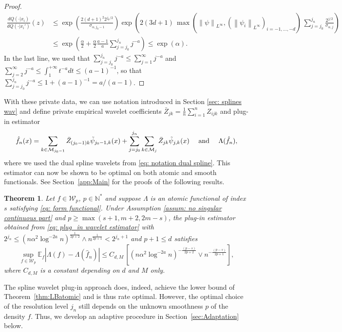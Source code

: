 \documentclass[preprint]{imsart}
\newcommand\norm[1]{\left\lVert#1\right\rVert}
\newtheorem{theorem}{Theorem}[section]
\numberwithin{equation}{section}
\begin{document}
\begin{proof}
\begin{align*}
\frac{dQ(\cdot |x_i)}{dQ(\cdot |x_i')}(z)
&\leq \exp\left(  \frac{2(d+1)^2 2^{j_0/2}}{\sigma_{\alpha,j_0-1}}\right)\exp\left( 2(3d+1)\, \max(\norm{\psi}_{L^\infty},(\norm{\psi_i}_{L^\infty})_{i=-1,\dots,-d})\, \sum_{j=j_0}^{j_n}\frac{2^{j/2}}{\sigma_{\alpha,j}}\right)\\
&\leq \exp\left(\frac{\alpha}{2} + \frac{\alpha}{2}\frac{a-1}{a} \sum_{j=j_0}^{j_n} j^{-a}\right)\leq \exp(\alpha).
\end{align*}
In the last line, we used that $\sum_{j=j_0}^{j_n} j^{-a} \leq \sum_{j=1}^{\infty} j^{-a}$ and $ \sum_{j=2}^{\infty} j^{-a}\leq \int_1^{+\infty} t^{-a} dt\leq (a-1)^{-1}$, so that $\sum_{j=j_0}^{j_n} j^{-a}\leq 1 + (a-1)^{-1} = a/(a-1)$.
\end{proof}

With these private data, we can use notation introduced in Section \ref{sec: splines wav} and define private empirical wavelet coefficients $\bar{Z}_{jk}=\frac1n \sum_{i=1}^n Z_{ijk}$ and plug-in estimator
\begin{equation}\label{eq: plug_in wavelet estimator}
\hat{f}_n(x)= \sum_{k\in\mathcal{M}_{j_0-1}} \bar{Z}_{(j_0-1)k}\Tilde{\psi}_{j_0-1,k}(x) + \sum_{j=j_0}^{j_n}\sum_{k\in\mathcal{M}_{j}} \bar{Z}_{jk} \Tilde{\psi}_{j,k}(x) \quad\text{ and }\quad \Lambda(\hat{f}_n),
\end{equation}
where we used the dual spline wavelets from \eqref{eq: notation dual spline}. This estimator can now be shown to be optimal on both atomic and smooth functionals. See Section~\ref{app:Main} for the proofs of the following results.
 

\begin{theorem}\label{th: atomic wav}
    Let $f\in \mathcal{W}_{p}$, $p\in\mathbb{N}^*$ and suppose $\Lambda$ is an atomic functional of index $s$ satisfying \eqref{eq: form functional}. Under Assumption \ref{assum: no singular continuous part} and $p\geq \max(s+1, m+2, 2m-s)$, the plug-in estimator obtained from 
    \eqref{eq: plug_in wavelet estimator} with $2^{j_n}\leq (n\alpha^2\log^{-2a} n)^{\frac{1}{2p+2}}\wedge n^{\frac{1}{2p+1}} < 2^{j_n+1}$ and $p+1\leq d$ satisfies
    \[\underset{f\in\mathcal{W}_p}{\sup}\mathbb{E}_f|\Lambda(f)-\Lambda(\hat{f}_n)|\leq C_{d,M}\,\left[ (n\alpha^2 \log^{-2a} n)^{-\frac{(p-s)}{2p+2}}\vee n^{-\frac{(p-s)}{2p+1}}\right],\]
    where $C_{d,M}$ is a constant depending on $d$ and $M$ only.
\end{theorem}

The spline wavelet plug-in approach does, indeed, achieve the lower bound of Theorem~\ref{thm:LBatomic} and is thus rate optimal. However, the optimal choice of the resolution level $j_n$ still depends on the unknown smoothness $p$ of the density $f$. Thus, we develop an adaptive procedure in Section~\ref{sec:Adaptation} below.
\end{document}
